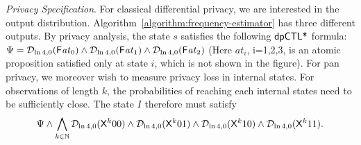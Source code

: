 \noindent
\emph{Privacy Specification}.
For classical differential privacy, we are interested in the output
distribution. Algorithm~\ref{algorithm:frequency-estimator} has three
different outputs. By privacy analysis, the state $s$ satisfies the
following $\textsf{dpCTL*}$ formula:
$
\Psi = \mathcal{D}_{{\ln 4}, {0}} (\mathsf{F} \mathit{at}_0) \wedge \mathcal{D}_{{\ln 4}, {0}} (\mathsf{F}
\mathit{at}_1) \wedge \mathcal{D}_{{\ln 4}, {0}} (\mathsf{F} \mathit{at}_2)
$
(Here
$\mathit{at}_i$, i=1,2,3, is an atomic proposition satisfied only at state $i$, which is not shown in the figure).
For pan privacy, we moreover wish to measure privacy loss in internal
states. For observations of length $k$, the probabilities of reaching
each internal states need to be sufficiently close. The state $I$
therefore must satisfy
\[
\Psi
\wedge
\bigwedge_{k \in \mathbb{N}}
\mathcal{D}_{{\ln 4}, {0}} (\mathsf{X}^k {00}) \wedge
\mathcal{D}_{{\ln 4}, {0}} (\mathsf{X}^k {01}) \wedge
\mathcal{D}_{{\ln 4}, {0}} (\mathsf{X}^k {10}) \wedge
\mathcal{D}_{{\ln 4}, {0}} (\mathsf{X}^k {11}).
\]
